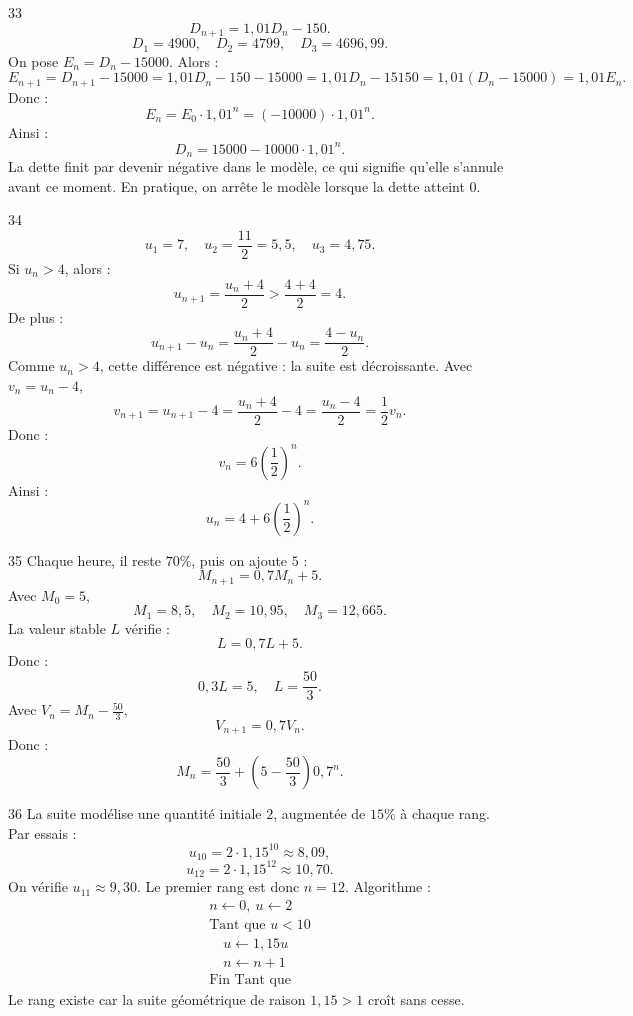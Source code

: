 \documentclass[11pt,a4paper]{article}
\begin{document}
\begin{solbox}{33}
\[
D_{n+1}=1{,}01D_n-150.
\]
\[
D_1=4900,\quad D_2=4799,\quad D_3=4696{,}99.
\]
On pose \(E_n=D_n-15000\). Alors :
\[
E_{n+1}=D_{n+1}-15000=1{,}01D_n-150-15000
=1{,}01D_n-15150=1{,}01(D_n-15000)=1{,}01E_n.
\]
Donc :
\[
E_n=E_0\cdot1{,}01^n=(-10000)\cdot1{,}01^n.
\]
Ainsi :
\[
D_n=15000-10000\cdot1{,}01^n.
\]
La dette finit par devenir négative dans le modèle, ce qui signifie qu'elle s'annule avant ce moment. En pratique, on arrête le modèle lorsque la dette atteint \(0\).
\end{solbox}

\begin{solbox}{34}
\[
u_1=7,\quad u_2=\frac{11}{2}=5{,}5,\quad u_3=4{,}75.
\]
Si \(u_n>4\), alors :
\[
u_{n+1}=\frac{u_n+4}{2}>\frac{4+4}{2}=4.
\]
De plus :
\[
u_{n+1}-u_n=\frac{u_n+4}{2}-u_n=\frac{4-u_n}{2}.
\]
Comme \(u_n>4\), cette différence est négative : la suite est décroissante.  
Avec \(v_n=u_n-4\),
\[
v_{n+1}=u_{n+1}-4=\frac{u_n+4}{2}-4=\frac{u_n-4}{2}=\frac12v_n.
\]
Donc :
\[
v_n=6\left(\frac12\right)^n.
\]
Ainsi :
\[
u_n=4+6\left(\frac12\right)^n.
\]
\end{solbox}

\begin{solbox}{35}
Chaque heure, il reste \(70\%\), puis on ajoute \(5\) :
\[
M_{n+1}=0{,}7M_n+5.
\]
Avec \(M_0=5\),
\[
M_1=8{,}5,\quad M_2=10{,}95,\quad M_3=12{,}665.
\]
La valeur stable \(L\) vérifie :
\[
L=0{,}7L+5.
\]
Donc :
\[
0{,}3L=5,\quad L=\frac{50}{3}.
\]
Avec \(V_n=M_n-\frac{50}{3}\),
\[
V_{n+1}=0{,}7V_n.
\]
Donc :
\[
M_n=\frac{50}{3}+\left(5-\frac{50}{3}\right)0{,}7^n.
\]
\end{solbox}

\begin{solbox}{36}
La suite modélise une quantité initiale \(2\), augmentée de \(15\%\) à chaque rang.  
Par essais :
\[
u_{10}=2\cdot1{,}15^{10}\approx8{,}09,
\]
\[
u_{12}=2\cdot1{,}15^{12}\approx10{,}70.
\]
On vérifie \(u_{11}\approx9{,}30\). Le premier rang est donc \(n=12\).  
Algorithme :
\[
\begin{array}{l}
n\leftarrow0,\ u\leftarrow2\\
\text{Tant que }u<10\\
\quad u\leftarrow1{,}15u\\
\quad n\leftarrow n+1\\
\text{Fin Tant que}
\end{array}
\]
Le rang existe car la suite géométrique de raison \(1{,}15>1\) croît sans cesse.
\end{solbox}
\end{document}
